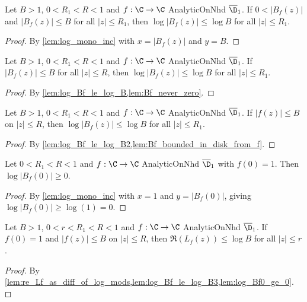 \begin{lemma}\label{lem:log_Bf_le_log_B}  \leanok
Let $B>1$, $0<R_1<R<1$ and $f:\C\to\C$ AnalyticOnNhd $\overline{\D}_1$. If $0<|B_f(z)|$ and $|B_f(z)|\le B$ for all $|z|\le R_1$, then $\log|B_f(z)| \le \log B$ for all $|z|\le R_1$.
\end{lemma}
\begin{proof} 
\leanok
By \cref{lem:log_mono_inc} with $x=|B_f(z)|$ and $y=B$.
\end{proof}

\begin{lemma}\label{lem:log_Bf_le_log_B2}  \leanok
Let $B>1$, $0<R_1<R<1$ and $f:\C\to\C$ AnalyticOnNhd $\overline{\D}_1$. If $|B_f(z)|\le B$ for all $|z|\le R$, then $\log|B_f(z)| \le \log B$ for all $|z|\le R_1$.
\end{lemma}
\begin{proof}  \leanok
By \cref{lem:log_Bf_le_log_B,lem:Bf_never_zero}.
\end{proof}

\begin{lemma}\label{lem:log_Bf_le_log_B3}  \leanok
Let $B>1$, $0<R_1<R<1$ and $f:\C\to\C$ AnalyticOnNhd $\overline{\D}_1$. If $|f(z)|\le B$ on $|z|\le R$, then $\log|B_f(z)| \le \log B$ for all $|z|\le R_1$.
\end{lemma}
\begin{proof}  \leanok
By \cref{lem:log_Bf_le_log_B2,lem:Bf_bounded_in_disk_from_f}.
\end{proof}

\begin{lemma}\label{lem:log_Bf0_ge_0}  \leanok
Let $0<R_1<R<1$ and $f:\C\to\C$ AnalyticOnNhd $\overline{\D}_1$ with $f(0)=1$. Then $\log|B_f(0)| \ge 0$.
\end{lemma}
\begin{proof}  \leanok
By \cref{lem:log_mono_inc} with $x=1$ and $y=|B_f(0)|$, giving $\log|B_f(0)| \ge\log(1)=0$.
\end{proof}

\begin{lemma}\label{lem:re_Lf_le_log_B}  \leanok
Let $B>1$, $0<r<R_1<R<1$ and $f:\C\to\C$ AnalyticOnNhd $\overline{\D}_1$. If $f(0)=1$ and $|f(z)|\le B$ on $|z|\le R$, then $\Re(L_f(z)) \le \log B$ for all $|z|\le r$.
\end{lemma}
\begin{proof}  \leanok
By \cref{lem:re_Lf_as_diff_of_log_mods,lem:log_Bf_le_log_B3,lem:log_Bf0_ge_0}.
\end{proof}

